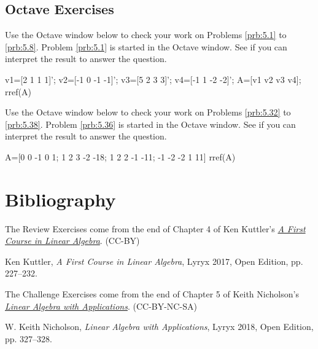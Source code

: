 \documentclass{ximera}
\begin{document}
\subsection*{Octave Exercises}
\begin{problem}\label{oct:find_dim_span_vectors}
Use the Octave window below to check your work on Problems \ref{prb:5.1} to \ref{prb:5.8}.  Problem \ref{prb:5.1} is started in the Octave window.  See if you can interpret the result to answer the question.

v1=[2 1 1 1]';
v2=[-1 0 -1 -1]';
v3=[5 2 3 3]';
v4=[-1 1 -2 -2]';
A=[v1 v2 v3 v4];
rref(A)
\end{problem}

\begin{problem}\label{oct:find_basis_important_subspaces}
Use the Octave window below to check your work on Problems \ref{prb:5.32} to \ref{prb:5.38}.  Problem \ref{prb:5.36} is started in the Octave window.  See if you can interpret the result to answer the question.

A=[0 0 -1 0 1; 1 2 3 -2 -18; 1 2 2 -1 -11; -1 -2 -2 1 11]
rref(A)
\end{problem}

\section*{Bibliography}
The Review Exercises come from the end of Chapter 4 of Ken Kuttler's \href{https://open.umn.edu/opentextbooks/textbooks/a-first-course-in-linear-algebra-2017}{\it A First Course in Linear Algebra}. (CC-BY)

Ken Kuttler, {\it  A First Course in Linear Algebra}, Lyryx 2017, Open Edition, pp. 227--232.  

The Challenge Exercises come from the end of Chapter 5 of Keith Nicholson's \href{https://open.umn.edu/opentextbooks/textbooks/linear-algebra-with-applications}{\it Linear Algebra with Applications}. (CC-BY-NC-SA)

W. Keith Nicholson, {\it Linear Algebra with Applications}, Lyryx 2018, Open Edition, pp. 327--328. 
\end{document}

